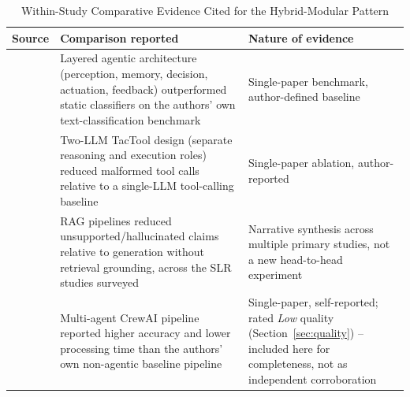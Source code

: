 \documentclass[sn-basic,Numbered]{sn-jnl}
\begin{document}
\begin{table}[h]
\centering
\caption{Within-Study Comparative Evidence Cited for the Hybrid-Modular
Pattern}
\label{tab:comparative_evidence}
\renewcommand{\arraystretch}{1.25}
\begin{tabularx}{\columnwidth}{|>{\RaggedRight\arraybackslash}p{}|>{\RaggedRight\arraybackslash}X|>{\RaggedRight\arraybackslash}p{}|}
\hline
\textbf{Source} & \textbf{Comparison reported} & \textbf{Nature of evidence} \\
\hline
\cite{sharma2025textclassification} &
Layered agentic architecture (perception, memory, decision, actuation,
feedback) outperformed static classifiers on the authors' own
text-classification benchmark &
Single-paper benchmark, author-defined baseline \\
\hline
\cite{singh2025tactool} &
Two-LLM TacTool design (separate reasoning and execution roles) reduced
malformed tool calls relative to a single-LLM tool-calling baseline &
Single-paper ablation, author-reported \\
\hline
\cite{han2024ragslr} &
RAG pipelines reduced unsupported/hallucinated claims relative to
generation without retrieval grounding, across the SLR studies
surveyed &
Narrative synthesis across multiple primary studies, not a new
head-to-head experiment \\
\hline
\cite{kunekar2025omnischolar} &
Multi-agent CrewAI pipeline reported higher accuracy and lower
processing time than the authors' own non-agentic baseline pipeline &
Single-paper, self-reported; rated \emph{Low} quality
(Section~\ref{sec:quality}) -- included here for completeness, not as
independent corroboration \\
\hline
\end{tabularx}
\end{table}
\end{document}
